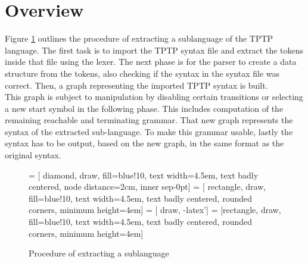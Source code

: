 \section{Overview}\label{sec:ConceptOverview}
Figure \ref{fig:ConceptProcessSublanguage} outlines the procedure of extracting a sublanguage of the \ac{TPTP} language.
The first task is to import the \ac{TPTP} syntax file and extract the tokens inside that file using the lexer.
The next phase is for the parser to create a data structure from the tokens, also checking if the syntax in the syntax file was correct.
Then, a graph representing the imported \ac{TPTP} syntax is built.\\
This graph is subject to manipulation by disabling certain transitions or selecting a new start symbol in the following phase.
This includes computation of the remaining reachable and terminating grammar.
That new graph represents the syntax of the extracted sub-language.
To make this grammar usable, lastly the syntax has to be output, based on the new graph, in the same format as the original syntax.
\begin{figure}[H]
 = [ diamond, draw, fill=blue!10, text width=4.5em, text badly centered, node distance=2cm, inner sep-0pt]  
 = [ rectangle, draw, fill=blue!10, text width=4.5em, text badly centered, rounded corners, minimum height=4em]  
 = [ draw, -latex']  
 = [rectangle, draw, fill=blue!10, text width=4.5em, text badly centered, rounded corners, minimum height=4em]  
\begin{center}
\end{center}
\caption{Procedure of extracting a sublanguage}
\label{fig:ConceptProcessSublanguage}
\end{figure}

